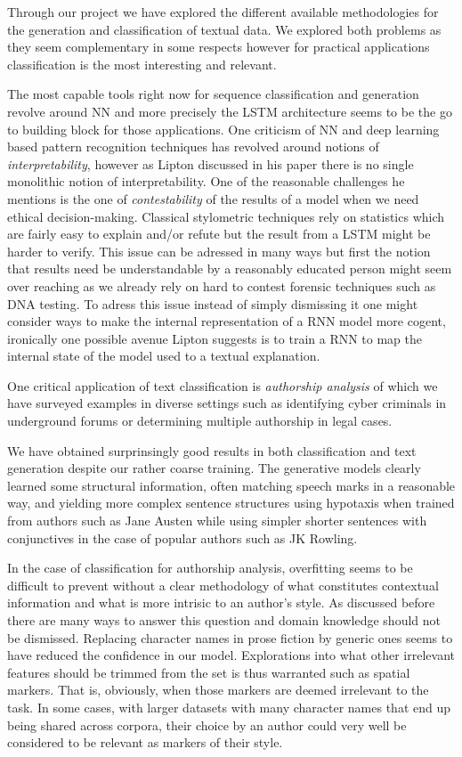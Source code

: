 Through our project we have explored the different available methodologies for
the generation and classification of textual data. We explored both problems as
they seem complementary in some respects however for practical applications
classification is the most interesting and relevant. 

The most capable tools right now  for sequence classification and generation
revolve around NN and more precisely the LSTM architecture seems to be the go
to building block for those applications. One criticism of NN and deep learning
based pattern recognition techniques has revolved around notions of
\textit{interpretability}, however as Lipton discussed in his paper
 there is no single monolithic notion of interpretability. One of
the reasonable challenges he mentions is the one of \textit{contestability} of
the results of a model when we need ethical decision-making. Classical
stylometric techniques rely on statistics which are fairly easy to explain
and/or refute but the result from a LSTM might be harder to verify. This issue
can be adressed in many ways but first the notion that results need be
understandable by a reasonably educated person might seem over reaching as we
already rely on hard to contest forensic techniques such as DNA testing. To
adress this issue instead of simply dismissing it one might consider ways to
make the internal representation of a RNN model more cogent, ironically one
possible avenue Lipton suggests is to train a RNN to map the internal state of
the model used to a textual explanation.

One critical application of text classification is \textit{authorship analysis}
of which we have surveyed examples in diverse settings such as identifying
cyber criminals in underground forums or determining multiple authorship in
legal cases. 

We have obtained surprinsingly good results in both classification and text
generation despite our rather coarse training. The generative models clearly
learned some structural information, often matching speech marks in a
reasonable way, and yielding more complex sentence structures using hypotaxis
when trained from authors such as Jane Austen while using simpler shorter
sentences with conjunctives in the case of popular authors such as JK Rowling. 

In the case of classification for authorship analysis, overfitting seems to be
difficult to prevent without a clear methodology of what constitutes contextual
information and what is more intrisic to an author's style. As discussed before
there are many ways to answer this question and domain knowledge should not be
dismissed. Replacing character names in prose fiction by generic ones seems to
have reduced the confidence in our model. Explorations into what other
irrelevant features should be trimmed from the set is thus warranted such as
spatial markers. That is, obviously, when those markers are deemed irrelevant
to the task. In some cases, with larger datasets with many character names that
end up being shared across corpora, their choice by an author could very well
be considered to be relevant as markers of their style.

